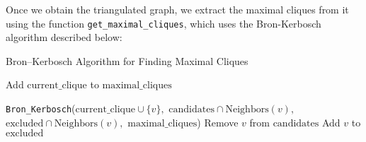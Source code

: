 \documentclass[a4paper,12pt]{article}
\begin{document}
\begin{center}
\end{center}
    Once we obtain the triangulated graph, we extract the maximal cliques from it using the function \texttt{get\_maximal\_cliques}, which uses the Bron-Kerbosch algorithm described below:

\begin{algorithm}
\caption{Bron–Kerbosch Algorithm for Finding Maximal Cliques}
\begin{algorithmic}[1]
            \State Add $\text{current\_clique}$ to $\text{maximal\_cliques}$
            \State \Return
        \EndIf
        
            \State \texttt{Bron\_Kerbosch}($\text{current\_clique} \cup \{v\},$
            \State \hspace{1cm} $\text{candidates} \cap \text{Neighbors}(v),$
            \State \hspace{1cm} $\text{excluded} \cap \text{Neighbors}(v),$
            \State \hspace{1cm} $\text{maximal\_cliques}$)
            \State Remove $v$ from $\text{candidates}$
            \State Add $v$ to $\text{excluded}$
        \EndFor
    \EndProcedure
\end{algorithmic}
\end{algorithm}
\end{document}
